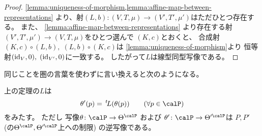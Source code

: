 \documentclass[report]{jlreq}
\begin{document}
\begin{proof}
    \cref{lemma:uniqueness-of-morphism,lemma:affine-map-between-representations}
    より、射$(L, b) \colon (V, T, \mu) \to (V', T', \mu')$はただひとつ存在する。
    また、
    \cref{lemma:affine-map-between-representations}
    より存在する射$(V', T', \mu') \to (V, T, \mu)$をひとつ選んで
    $(K, c)$とおくと、
    合成射$(K, c) \circ (L, b), \; (L, b) \circ (K, c)$は
    \cref{lemma:uniqueness-of-morphism}より
    恒等射$(\mathrm{id}_V, 0), \; (\mathrm{id}_{V'}, 0)$に一致する。
    したがって$L$は線型同型写像である。
\end{proof}

同じことを圏の言葉を使わずに言い換えると次のようになる。


\begin{corollary}[自然パラメータの変換]
    上の定理の$L$は
    \begin{equation}
        \theta'(p)
            = \up{t}L(\theta(p))
            \qquad
            (\forall p \in \calP)
    \end{equation}
    をみたす。
    ただし
    写像$\theta \colon \calP \to \Theta^\calP$
    および
    $\theta' \colon \calP \to \Theta'^\calP$は
    $P, P'$ (の$\Theta^\calP, \Theta'^\calP$上への制限) の逆写像である。
\end{corollary}
\end{document}
